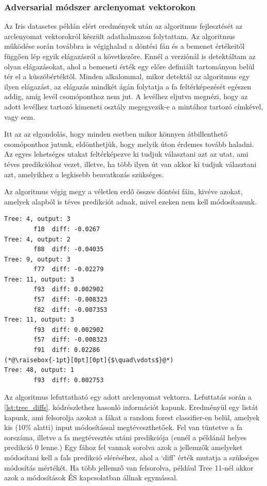 \subsubsection*{Adversarial módszer arclenyomat vektorokon}

Az Iris datasetes példán elért eredmények után az algoritmus fejlesztését az arclenyomat vektorokról készült adathalmazon folytattam. Az algoritmus működése során továbbra is végighalad a döntési fán és a bemenet értékeitől függően lép egyik elágazásról a következőre. Ennél a verziónál is detektáltam az olyan elágazásokat, ahol a bemeneti érték egy előre definiált tartományon belül tér el a küszöbértéktől. Minden alkalommal, mikor detektál az algoritmus egy ilyen elágazást, az elágazás mindkét ágán folytatja a fa feltérképezését egészen addig, amíg levél csomóponthoz nem jut. A levélhez eljutva megnézi, hogy az adott levélhez tartozó kimeneti osztály megegyezik-e a mintához tartozó címkével, vagy sem.

Itt az az elgondolás, hogy minden esetben mikor könnyen átbillenthető csomóponthoz jutunk, eldönthetjük, hogy melyik úton érdemes tovább haladni. Az egyes lehetséges utakat feltérképezve ki tudjuk választani azt az utat, ami téves predikcióhoz vezet, illetve, ha több ilyen út van akkor ki tudjuk választani azt, amelyikhez a legkisebb beavatkozás szükséges. 

Az algoritmus végig megy a véletlen erdő összes döntési fáin, kivéve azokat, amelyek alapból is téves predikciót adnak, mivel ezeken nem kell módosítanunk.

\begin{lstlisting}[caption={Algoritmus futtatása egy adott arclenyomat vektorra.}, label=lst:tree_diffs]
Tree: 4, output: 3
		f10  diff: -0.0267
Tree: 4, output: 2
		f88  diff: -0.04035
Tree: 9, output: 3
		f77  diff: -0.02279
Tree: 11, output: 3
		f93  diff: 0.002902
		f57  diff: -0.008323
		f82  diff: -0.007353
Tree: 11, output: 3
		f93  diff: 0.002902
		f57  diff: -0.008323
		f91  diff: 0.02286
(*@\raisebox{-1pt}[0pt][0pt]{$\quad\vdots$}@*)
Tree: 48, output: 1
		f93  diff: 0.002753
\end{lstlisting}

Az algoritmus lefuttatható egy adott arclenyomat vektorra. Lefuttatás során a \ref{lst:tree_diffs}. kódrészlethez hasonló információt kapunk. Eredményül egy listát kapunk, ami felsorolja azokat a fákat a random forest classifier-en belül, amelyek kis (10\% alatti) input módosítással megtéveszthetőek. Fel van tüntetve a fa sorszáma, illetve a fa megtévesztés utáni predikciója (ennél a példánál helyes predikció 0 lenne.) Egy fához fel vannak sorolva azok a jellemzők amelyeket módosítani kell a fals predikció eléréséhez, ahol a ‘diff’ érték mutatja a szükséges módosítás mértékét. Ha több jellemző van felsorolva, például Tree 11-nél akkor azok a módosítások ÉS kapcsolatban állnak egymással.

